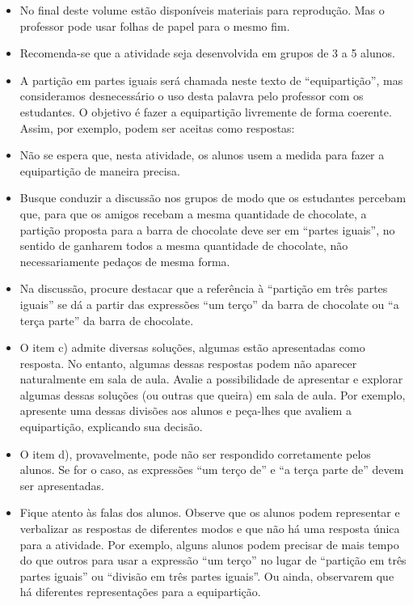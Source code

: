 \begin{multicols}{2}
  \begin{itemize} %
  \item No final deste volume estão disponíveis materiais para reprodução. Mas o professor pode usar folhas de papel para o mesmo fim.
  \item Recomenda-se que a atividade seja desenvolvida em grupos de 3 a 5 alunos.
  \item A partição em partes iguais será chamada neste texto de ``equipartição'', mas consideramos desnecessário o uso desta palavra pelo professor com os estudantes. O objetivo é fazer a equipartição livremente de forma coerente. Assim, por exemplo, podem ser aceitas como respostas:
    \begin{center}
    \end{center}
  \item  Não se espera que, nesta atividade, os alunos usem a medida para fazer a equipartição de maneira precisa.
    \item Busque conduzir a discussão nos grupos de modo que os estudantes percebam que, para que os amigos recebam a mesma quantidade de chocolate, a partição proposta para a barra de chocolate deve ser em ``partes iguais'', no sentido de ganharem todos a mesma quantidade de chocolate, não necessariamente pedaços de mesma forma.
    \item Na discussão, procure destacar que a referência à ``partição em três partes iguais'' se dá a partir das expressões ``um terço'' da barra de chocolate ou ``a terça parte'' da barra de chocolate.
    \item O item c) admite diversas soluções, algumas estão apresentadas como resposta. No entanto, algumas dessas respostas podem não aparecer naturalmente em sala de aula. Avalie a possibilidade de apresentar e explorar algumas dessas soluções (ou outras que queira) em sala de aula. Por exemplo, apresente uma dessas divisões aos alunos e peça-lhes que avaliem a equipartição, explicando sua decisão.
    \item O item d), provavelmente, pode não ser respondido corretamente pelos alunos. Se for o caso, as expressões ``um terço de'' e ``a terça parte de'' devem ser apresentadas.
    \item Fique atento às falas dos alunos. Observe que os alunos podem representar e verbalizar as respostas de diferentes modos e que não há uma resposta única para a atividade. Por exemplo, alguns alunos podem precisar de mais tempo do que outros para usar a expressão       ``um terço'' no lugar de       ``partição em três partes iguais'' ou ``divisão em três partes iguais''. Ou ainda, observarem que há diferentes representações para a equipartição.

\end{itemize}
\end{multicols}
